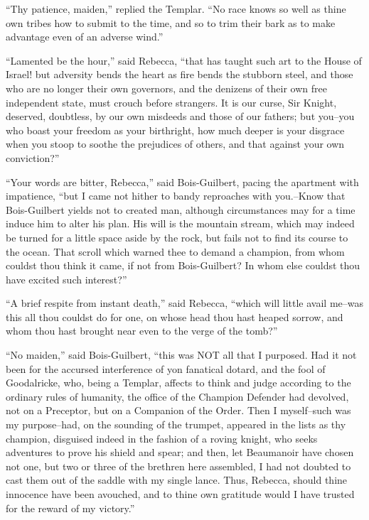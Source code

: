 ``Thy patience, maiden,'' replied the Templar. ``No race knows so well
as thine own tribes how to submit to the time, and so to trim their bark
as to make advantage even of an adverse wind.''

``Lamented be the hour,'' said Rebecca, ``that has taught such art to
the House of Israel! but adversity bends the heart as fire bends the
stubborn steel, and those who are no longer their own governors, and the
denizens of their own free independent state, must crouch before
strangers. It is our curse, Sir Knight, deserved, doubtless, by our own
misdeeds and those of our fathers; but you--you who boast your freedom
as your birthright, how much deeper is your disgrace when you stoop to
soothe the prejudices of others, and that against your own conviction?''

``Your words are bitter, Rebecca,'' said Bois-Guilbert, pacing the
apartment with impatience, ``but I came not hither to bandy reproaches
with you.--Know that Bois-Guilbert yields not to created man, although
circumstances may for a time induce him to alter his plan. His will is
the mountain stream, which may indeed be turned for a little space aside
by the rock, but fails not to find its course to the ocean. That scroll
which warned thee to demand a champion, from whom couldst thou think it
came, if not from Bois-Guilbert? In whom else couldst thou have excited
such interest?''

``A brief respite from instant death,'' said Rebecca, ``which will
little avail me--was this all thou couldst do for one, on whose head
thou hast heaped sorrow, and whom thou hast brought near even to the
verge of the tomb?''

``No maiden,'' said Bois-Guilbert, ``this was NOT all that I purposed.
Had it not been for the accursed interference of yon fanatical dotard,
and the fool of Goodalricke, who, being a Templar, affects to think and
judge according to the ordinary rules of humanity, the office of the
Champion Defender had devolved, not on a Preceptor, but on a Companion
of the Order. Then I myself--such was my purpose--had, on the sounding
of the trumpet, appeared in the lists as thy champion, disguised indeed
in the fashion of a roving knight, who seeks adventures to prove his
shield and spear; and then, let Beaumanoir have chosen not one, but two
or three of the brethren here assembled, I had not doubted to cast them
out of the saddle with my single lance. Thus, Rebecca, should thine
innocence have been avouched, and to thine own gratitude would I have
trusted for the reward of my victory.''

